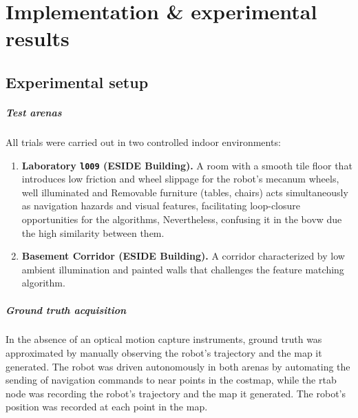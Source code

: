 
\chapter{Implementation \& experimental results}\label{ch:implementation}

\section{Experimental setup}
\label{sec:exp_setup}

\paragraph*{Test arenas}
\label{sec:test_arenas}

All trials were carried out in two controlled indoor environments:

\begin{enumerate}[label=(\alph*)]
  \item \textbf{Laboratory \texttt{l009} (ESIDE Building).}
        A room with a smooth tile floor that introduces low friction and wheel slippage for the robot's mecanum wheels, well illuminated and Removable furniture (tables, chairs) acts simultaneously as navigation hazards and visual features, facilitating loop-closure opportunities for the algorithms, Nevertheless, confusing it in the \gls{bovw} due the high similarity between them.

  \item \textbf{Basement Corridor (ESIDE Building).}
        A corridor characterized by low ambient illumination and painted walls that challenges the feature matching algorithm.
\end{enumerate}


\paragraph*{Ground truth acquisition}
\label{sec:gt_acquisition}

In the absence of an optical motion capture instruments, ground truth was approximated by manually observing the robot's trajectory and the map it generated. The robot was driven autonomously in both arenas by automating the sending of navigation commands to near points in the costmap, while the \gls{rtab} node was recording the robot's trajectory and the map it generated. The robot's position was recorded at each point in the map.

